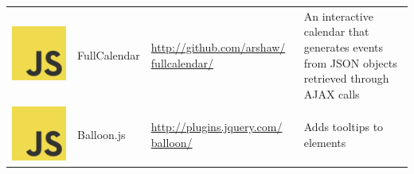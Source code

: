 \documentclass[12pt, a4paper]{article}
\begin{document}
\begin{table}[H]
{\begin{tabular}{|m{0.3cm}m{2.4cm}m{5.6cm}m{8.8cm}|}
\includegraphics[scale=0.02]{js.png}& FullCalendar & \href{http://github.com/arshaw/fullcalendar/}{http://github.com/arshaw/ fullcalendar/} & An interactive calendar that generates events from JSON objects retrieved through AJAX calls \\
\includegraphics[scale=0.02]{js.png}& Balloon.js & \href{http://plugins.jquery.com/balloon/}{http://plugins.jquery.com/ balloon/} & Adds tooltips to elements \\

\end{tabular}}
\end{table}
\end{document}
